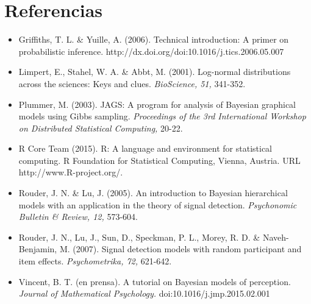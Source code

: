 \documentclass{article}
\begin{document}
\section*{Referencias}
	\begin{itemize}
	\setlength{\itemindent}{-.15in}
	
	
	\item[]{Griffiths, T. L. \& Yuille, A. (2006). Technical introduction: A primer on probabilistic inference. http://dx.doi.org/doi:10.1016/j.tics.2006.05.007}
	
	\item[]{Limpert, E., Stahel, W. A. \& Abbt, M. (2001). Log-normal distributions across the sciences: Keys and clues. \emph{BioScience, 51,} 341-352.}
	
    \item[]{Plummer, M. (2003). JAGS: A program for analysis of Bayesian graphical models using Gibbs sampling. \emph{Proceedings of the 3rd International Workshop on Distributed Statistical Computing,} 20-22.}
    
    \item[]{R Core Team (2015). R: A language and environment for statistical
  computing. R Foundation for Statistical Computing, Vienna, Austria. URL
  http://www.R-project.org/.}
  
    \item[]{Rouder, J. N. \& Lu, J. (2005). An introduction to Bayesian hierarchical models with an application in the theory of signal detection. \emph{Psychonomic Bulletin \& Review, 12,} 573-604.}
    
    \item[]{Rouder, J. N., Lu, J., Sun, D., Speckman, P. L., Morey, R. D. \& Naveh-Benjamin, M. (2007). Signal detection models with random participant and item effects. \emph{Psychometrika, 72,} 621-642.}
     
    \item[]{Vincent, B. T. (en prensa). A tutorial on Bayesian models of perception. \emph{Journal of Mathematical Psychology.}         doi:10.1016/j.jmp.2015.02.001}
     
    \end{itemize}
    
    
\end{document}
